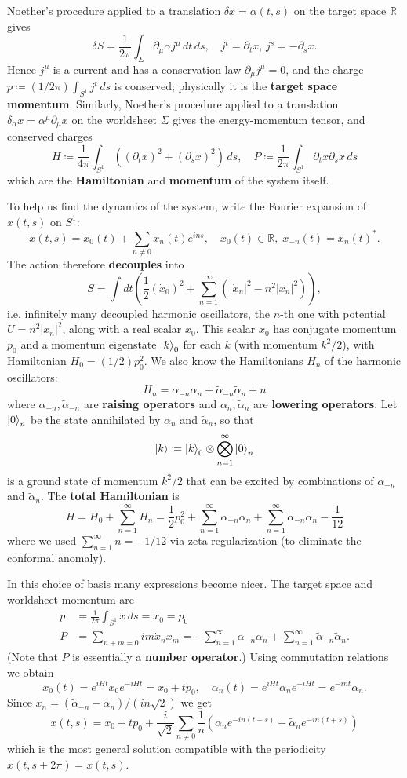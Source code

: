 \documentclass{report}
\theoremstyle{plain}
\theoremstyle{definition}
\theoremstyle{remark}
\newcommand{\di}{\partial}
\newcommand{\bR}{\mathbb{R}}
\begin{document}
Noether's procedure applied to a translation $\delta x = \alpha(t, s)$
on the target space $\bR$ gives
\[ \delta S = \frac{1}{2\pi} \int_\Sigma \di_\mu\alpha j^\mu \, dt \, ds, \quad j^t = \di_t x, \, j^s = -\di_s x. \]
Hence $j^\mu$ is a current and has a conservation law $\di_\mu j^\mu =
0$, and the charge $p \coloneqq (1/2\pi) \int_{S^1} j^t \, ds$ is
conserved; physically it is the {\bf target space momentum}.
Similarly, Noether's procedure applied to a translation $\delta_\alpha
x = \alpha^\mu \di_\mu x$ on the worldsheet $\Sigma$ gives the
energy-momentum tensor, and conserved charges
\[ H \coloneqq \frac{1}{4\pi} \int_{S^1} \left((\di_t x)^2 + (\di_s x)^2\right) \, ds, \quad P \coloneqq \frac{1}{2\pi} \int_{S^1} \di_t x \di_s x \, ds \]
which are the {\bf Hamiltonian} and {\bf momentum} of the system
itself.

To help us find the dynamics of the system, write the Fourier
expansion of $x(t, s)$ on $S^1$:
\[ x(t, s) = x_0(t) + \sum_{n \neq 0} x_n(t) e^{ins}, \quad x_0(t) \in \bR, \; x_{-n}(t) = x_n(t)^*. \]
The action therefore {\bf decouples} into
\[ S = \int dt \left(\frac{1}{2}(\dot x_0)^2 + \sum_{n=1}^\infty (|\dot x_n|^2 - n^2 |x_n|^2)\right), \]
i.e. infinitely many decoupled harmonic oscillators, the $n$-th one
with potential $U = n^2|x_n|^2$, along with a real scalar $x_0$. This
scalar $x_0$ has conjugate momentum $p_0$ and a momentum eigenstate
$\ket{k}_0$ for each $k$ (with momentum $k^2/2$), with Hamiltonian
$H_0 = (1/2)p_0^2$. We also know the Hamiltonians $H_n$ of the
harmonic oscillators:
\[ H_n = \alpha_{-n}\alpha_n + \tilde{\alpha}_{-n}\tilde{\alpha}_n + n \]
where $\alpha_{-n}, \tilde{\alpha}_{-n}$ are {\bf raising operators}
and $\alpha_n, \tilde{\alpha}_n$ are {\bf lowering operators}. Let
$\ket{0}_n$ be the state annihilated by $\alpha_n$ and
$\tilde{\alpha}_n$, so that
\[ \ket{k} \coloneqq \ket{k}_0 \otimes \bigotimes_{n=1}^\infty \ket{0}_n \]
is a ground state of momentum $k^2/2$ that can be excited by
combinations of $\alpha_{-n}$ and $\tilde{\alpha}_n$. The {\bf total
  Hamiltonian} is
\[ H = H_0 + \sum_{n=1}^\infty H_n = \frac{1}{2}p_0^2 + \sum_{n=1}^\infty \alpha_{-n}\alpha_n + \sum_{n=1}^\infty \tilde{\alpha}_{-n}\tilde{\alpha}_n - \frac{1}{12} \]
where we used $\sum_{n=1}^\infty n = -1/12$ via zeta regularization
(to eliminate the conformal anomaly).

In this choice of basis many expressions become nicer. The target
space and worldsheet momentum are
\begin{align*}
  p &= \frac{1}{2\pi} \int_{S^1} \dot x \, ds = \dot x_0 = p_0 \\
  P &= \sum_{n+m=0} im \dot x_n x_m = -\sum_{n=1}^\infty \alpha_{-n}\alpha_n + \sum_{n=1}^\infty \tilde\alpha_{-n}\tilde\alpha_n.
\end{align*}
(Note that $P$ is essentially a {\bf number operator}.) Using
commutation relations we obtain 
\[ x_0(t) = e^{iHt}x_0 e^{-iHt} = x_0 + tp_0, \quad \alpha_n(t) = e^{iHt} \alpha_n e^{-iHt} = e^{-int}\alpha_n. \]
Since $x_n = (\tilde\alpha_{-n} - \alpha_n)/(in\sqrt{2})$ we get
\[ x(t, s) = x_0 + tp_0 + \frac{i}{\sqrt{2}} \sum_{n \neq 0} \frac{1}{n} (\alpha_n e^{-in(t-s)} + \tilde\alpha_n e^{-in(t+s)}) \]
which is the most general solution compatible with the periodicity
$x(t, s+2\pi) = x(t,s)$.
\end{document}
